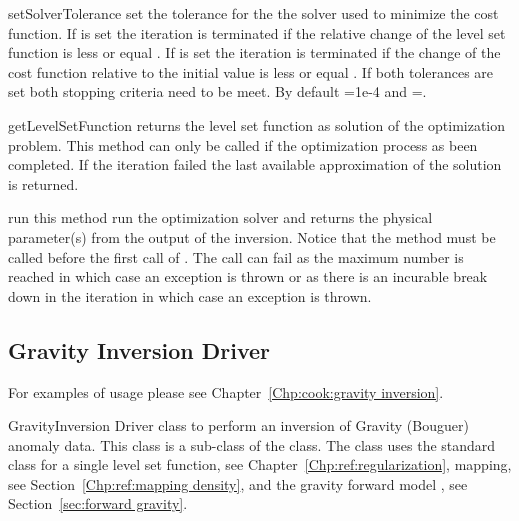 \begin{methoddesc}[InversionDriver]{setSolverTolerance}{ }
set the tolerance for the the solver used to minimize the cost function. If  is set the iteration is terminated 
if the relative change of the level set function is less or equal . 
 If  is set the iteration is terminated 
if the change of the cost function relative to the initial value is less or equal . If both 
tolerances are set both stopping criteria need to be meet. By default =1e-4 and =\None.
\end{methoddesc}

\begin{methoddesc}[InversionDriver]{getLevelSetFunction}{}
returns the level set function as solution of the optimization problem. This method can only be called if the
optimization process as been completed. If the iteration failed the last available approximation of the
solution is returned.
\end{methoddesc}
        
\begin{methoddesc}[InversionDriver]{run}{}
this method run the optimization solver and returns the physical parameter(s) 
from the output of the inversion. Notice that the  method must be called before the first call
of .
The call can fail as the maximum number is reached in which case
an  exception is thrown or as there is an incurable break down in the
iteration in which case an  exception is thrown. 
\end{methoddesc}

\subsection{Gravity Inversion Driver}
For examples of usage please see Chapter~\ref{Chp:cook:gravity inversion}.

\begin{classdesc}{GravityInversion}{}
Driver class to perform an inversion of  Gravity (Bouguer) anomaly data. This class
is a sub-class of the  class. The class uses the standard
 class for a single level set function, see Chapter~\ref{Chp:ref:regularization},
 mapping, see Section~\ref{Chp:ref:mapping density}, and the 
gravity forward model , see Section~\ref{sec:forward gravity}.
\end{classdesc}

